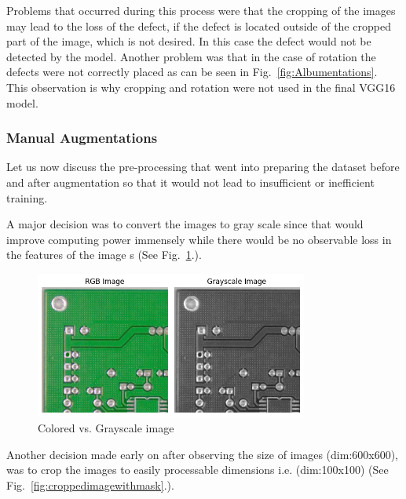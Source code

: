 \documentclass[12pt]{article}
\begin{document}
Problems that occurred during this process were that the cropping of the images may lead to the loss of the defect, if the defect is located outside of the cropped part of the image, which is not desired.
In this case the defect would not be detected by the model. Another problem was that in the case of rotation the defects were not correctly placed as can be seen in Fig.~\ref{fig:Albumentations}. This observation is why cropping and rotation were not used in the final VGG16 model.

\subsubsection{Manual Augmentations}
Let us now discuss the pre-processing that went into preparing the dataset before and after augmentation so that it would not lead to insufficient or inefficient training.

A major decision was to convert the images to gray scale since that would improve computing power immensely while there would be no observable loss in the features of the image s\cite{Saponara2022} (See Fig.~\ref{fig:Rgb_gray}.).
\begin{figure}[h]
    \centering
    \includegraphics[width=0.8\textwidth]{./graphics/rgb vs grayscale.png}
    \caption{Colored vs. Grayscale image}
    \label{fig:Rgb_gray}
\end{figure}

Another decision made early on after observing the size of images (dim:600x600), was to crop the images to easily processable dimensions i.e. (dim:100x100) \cite{Saponara2022} (See Fig.~\ref{fig:croppedimagewithmask}.). 
\end{document}
